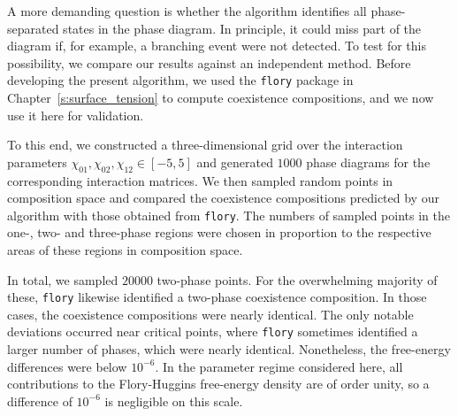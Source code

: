\documentclass[12pt]{article}
\begin{document}
A more demanding question is whether the algorithm identifies all phase-separated states in the phase diagram.
In principle, it could miss part of the diagram if, for example, a branching event were not detected.
To test for this possibility, we compare our results against an independent method.
Before developing the present algorithm, we used the \texttt{flory} package \cite{Yicheng2025flory} in Chapter~\ref{s:surface_tension} to compute coexistence compositions, and we now use it here for validation.

To this end, we constructed a three-dimensional grid over the interaction parameters \(\chi_{01}, \chi_{02}, \chi_{12} \in [-5, 5]\) and generated $1000$ phase diagrams for the corresponding interaction matrices.
We then sampled random points in composition space and compared the coexistence compositions predicted by our algorithm with those obtained from \texttt{flory}.
The numbers of sampled points in the one-, two- and three-phase regions were chosen in proportion to the respective areas of these regions in composition space. 

In total, we sampled $20000$ two-phase points. For the overwhelming majority of these, \texttt{flory} likewise identified a two-phase coexistence composition.
In those cases, the coexistence compositions were nearly identical.
The only notable deviations occurred near critical points, where \texttt{flory} sometimes identified a larger number of phases, which were nearly identical.
Nonetheless, the free-energy differences were below $10^{-6}$. In the parameter regime considered here, all contributions to the Flory-Huggins free-energy density are of order unity, so a difference of $10^{-6}$ is negligible on this scale.
\end{document}
